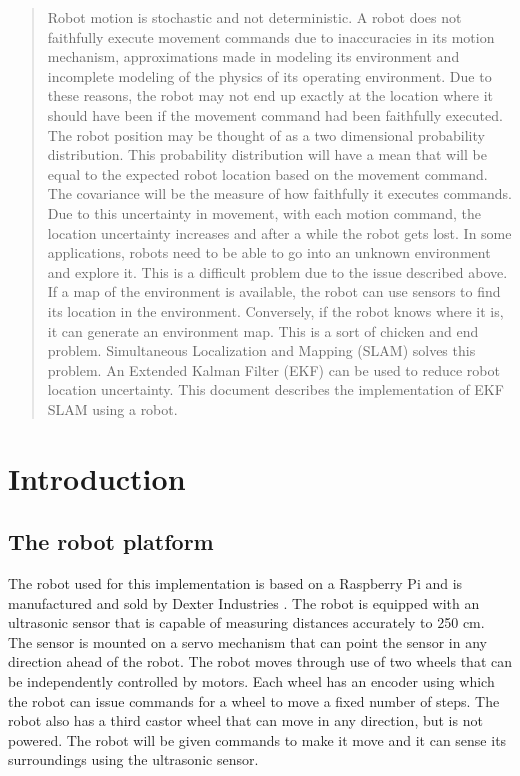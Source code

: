 \documentclass[conference]{IEEEtran}
\begin{document}
\begin{abstract}
Robot motion is stochastic and not deterministic. A robot does not faithfully execute movement commands due to inaccuracies in its motion mechanism, approximations made in modeling its environment and incomplete modeling of the physics of its operating environment. Due to these reasons, the robot may not end up exactly at the location where it should have been if the movement command had been faithfully executed. The robot position may be thought of as a two dimensional probability distribution. This probability distribution will have a mean that will be equal to the expected robot location based on the movement command. The covariance will be the measure of how faithfully it executes commands. Due to this uncertainty in movement, with each motion command, the location uncertainty increases and after a while the robot gets lost. In some applications, robots need to be able to go into an unknown environment and explore it. This is a difficult problem due to the issue described above. If a map of the environment is available, the robot can use sensors to find its location in the environment. Conversely, if the robot knows where it is, it can generate an environment map. This is a sort of chicken and end problem. Simultaneous Localization and Mapping (SLAM) solves this problem. An Extended Kalman Filter (EKF) can be used to reduce robot location uncertainty. This document describes the implementation of EKF SLAM using a robot.
\end{abstract}





%
\IEEEpeerreviewmaketitle

\section{Introduction}
\subsection{The robot platform}
The robot used for this implementation is based on a Raspberry Pi and is manufactured and sold by Dexter Industries \cite{dexter}. The robot is equipped with an ultrasonic sensor that is capable of measuring distances accurately to 250 cm. The sensor is mounted on a servo mechanism that can point the sensor in any direction ahead of the robot. The robot moves through use of two wheels that can be independently controlled by motors. Each wheel has an encoder using which the robot can issue commands for a wheel to move a fixed number of steps. The robot also has a third castor wheel that can move in any direction, but is not powered. The robot will be given commands to make it move and it can sense its surroundings using the ultrasonic sensor.
\end{document}
